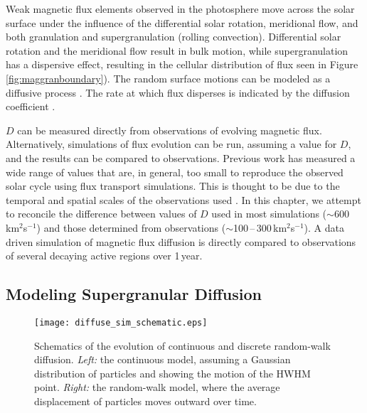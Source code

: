 \nocite{Smithson:1973,Devore:1985,Schrijver:1990,Komm:1995,Wang:2000,Wang:2002}

Weak magnetic flux elements observed in the photosphere move across the solar surface under the influence of the differential solar rotation, meridional flow, and both granulation and supergranulation (rolling convection). Differential solar rotation and the meridional flow result in bulk motion, while supergranulation has a dispersive effect, resulting in the cellular distribution of flux seen in Figure\,\ref{fig:maggranboundary}). The random surface motions can be modeled as a diffusive process \citep{Sheeley:2005}. The rate at which flux disperses is indicated by the diffusion coefficient \citep[$D$][]{Einstein:1905}. 

$D$ can be measured directly from observations of evolving magnetic flux. Alternatively, simulations of flux evolution can be run, assuming a value for $D$, and the results can be compared to observations. Previous work has measured a wide range of values that are, in general, too small to reproduce the observed solar cycle using flux transport simulations. This is thought to be due to the temporal and spatial scales of the observations used \citep{Schrijver:1996}. In this chapter, we attempt to reconcile the difference between values of $D$ used in most simulations ($\sim$600\,km$^2$s$^{-1}$) and those determined from observations ($\sim$100\,--\,300\,km$^2$s$^{-1}$). A data driven simulation of magnetic flux diffusion is directly compared to observations of several decaying active regions over 1\,year.

\subsection{Modeling Supergranular Diffusion}

 \begin{figure}[!t]    %
   \centerline{\texttt{[image: diffuse\_sim\_schematic.eps]}
              }
              \caption[Schematics of the evolution of continuous and discrete random-walk diffusion.]{Schematics of the evolution of continuous and discrete random-walk diffusion. \emph{Left:} the continuous model, assuming a Gaussian distribution of particles and showing the motion of the HWHM point. \emph{Right:} the random-walk model, where the average displacement of particles moves outward over time.}
   \label{fig:diffschematic}
   \end{figure}

